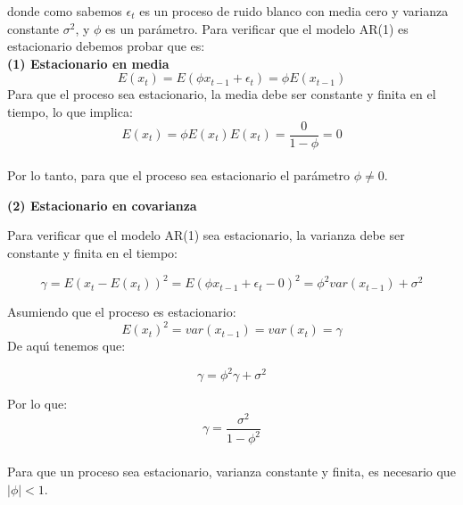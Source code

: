 donde como sabemos $\epsilon_t$ es un proceso de ruido blanco con media cero y varianza constante $\sigma^2$, y $\phi$ es un par\'ametro. Para verificar que el modelo AR(1) es estacionario debemos probar que es:\\
\vspace{4mm}	
\textbf{(1) Estacionario en media}
\begin{equation}
E(x_t) = E(\phi x_{t-1} + \epsilon_t)=\phi E(x_{t-1} )
\end{equation}
Para que el proceso sea estacionario, la media debe ser constante y finita en el tiempo, lo que implica:
\begin{equation}
E(x_t) = \phi E(x_{t} )
E(x_t) = \frac{0}{1-\phi}=0
\end{equation}
\\
Por lo tanto, para que el proceso sea estacionario el par\'ametro $\phi \ne 0$.



\textbf{(2) Estacionario en covarianza}

Para verificar que el modelo AR(1) sea estacionario, la varianza debe ser constante y finita en el tiempo:

\begin{equation}
\gamma = E(x_t-E(x_t))^2 = E(\phi x_{t-1} + \epsilon_t - 0)^2 = \phi^2 var(x_{t-1}) + \sigma^2
\end{equation}

Asumiendo que el proceso es estacionario:
\begin{equation}
E(x_t)^2 = var(x_{t-1}) = var(x_{t}) = \gamma
\end{equation}
De aqu\'{\i} tenemos que:

\begin{equation}
\gamma  = \phi^2 \gamma + \sigma^2
\end{equation}

Por lo que:
\begin{equation}
\gamma  = \frac{\sigma^2}{1-\phi^2}
\end{equation}\\
Para que un proceso sea estacionario, varianza constante y finita, es necesario que $|\phi|< 1$.

